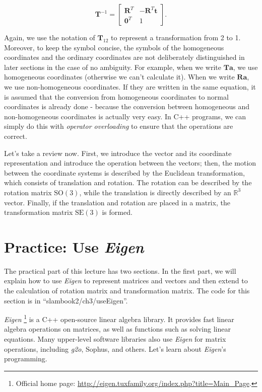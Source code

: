 \begin{equation}
{ \mathbf{T}^{ - 1}} = \left[ {\begin{array}{*{20}{c}}
    {{\mathbf{R}^T}}&{ - {\mathbf{R}^T}\mathbf{t}}\\
    {{\mathbf{0}^T}}&1
    \end{array}} \right].
\end{equation}

Again, we use the notation of $ \mathbf{T}_{12} $ to represent a transformation from 2 to 1. Moreover, to keep the symbol concise, the symbols of the homogeneous coordinates and the ordinary coordinates are not deliberately distinguished in later sections in the case of no ambiguity. For example, when we write $ \mathbf {T} \mathbf{a} $, we use homogeneous coordinates (otherwise we can't calculate it). When we write $ \mathbf{Ra} $, we use non-homogeneous coordinates. If they are written in the same equation, it is assumed that the conversion from homogeneous coordinates to normal coordinates is already done - because the conversion between homogeneous and non-homogeneous coordinates is actually very easy. In C++ programs, we can simply do this with \textit{operator overloading} to ensure that the operations are correct.

Let's take a review now. First, we introduce the vector and its coordinate representation and introduce the operation between the vectors; then, the motion between the coordinate systems is described by the Euclidean transformation, which consists of translation and rotation. The rotation can be described by the rotation matrix $ \mathrm{SO}( 3 ) $, while the translation is directly described by an $ \mathbb{R}^ 3 $ vector. Finally, if the translation and rotation are placed in a matrix, the transformation matrix $ \mathrm{SE}( 3 ) $ is formed.

\section{Practice: Use \textit{Eigen}}
The practical part of this lecture has two sections. In the first part, we will explain how to use \textit{Eigen} to represent matrices and vectors and then extend to the calculation of rotation matrix and transformation matrix. The code for this section is in ``slambook2/ch3/useEigen''.

\textit{Eigen} \footnote{Official home page: \url{http://eigen.tuxfamily.org/index.php?title=Main_Page}. } is a C++ open-source linear algebra library. It provides fast linear algebra operations on matrices, as well as functions such as solving linear equations. Many upper-level software libraries also use \textit{Eigen} for matrix operations, including \textit{g2o}, Sophus, and others. Let's learn about \textit{Eigen}'s programming.

